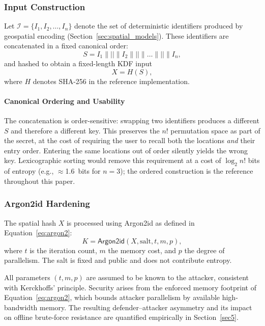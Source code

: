 \documentclass[mathematics,article,accept,pdftex,moreauthors]{Definitions/mdpi}
\begin{document}
\subsubsection{Input Construction}

Let $\mathcal{I} = \{I_1, I_2, \dots, I_n\}$ denote the set of deterministic identifiers produced by geospatial encoding (Section~\ref{sec:spatial_models}). These identifiers are concatenated in a fixed canonical order:
\begin{equation}
S = I_1 \parallel \texttt{||} \parallel I_2 \parallel \texttt{||} \parallel \dots \parallel \texttt{||} \parallel I_n ,
\label{eq:spatial_concat}
\end{equation}
and hashed to obtain a fixed-length KDF input
\begin{equation}
X = H(S),
\label{eq:spatial_hash}
\end{equation}
where $H$ denotes SHA-256 in the reference implementation.

\paragraph*{Canonical Ordering and Usability} 

{The concatenation is order-sensitive: swapping two identifiers produces a different $S$ and therefore a different key. This preserves the $n!$ permutation space as part of the secret, at the cost of requiring the user to recall both the locations \emph{and} their entry order. Entering the same locations out of order silently yields the wrong key. Lexicographic sorting would remove this requirement at a cost of $\log_2 n!$ bits of entropy (e.g., $\approx$1.6~bits for $n=3$); the ordered construction is the reference throughout this paper.}

\subsubsection{Argon2id Hardening}

The spatial hash $X$ is processed using Argon2id as defined in Equation~\eqref{eq:argon2}:
\begin{equation}
K = \mathsf{Argon2id}(X, \text{salt}, t, m, p),
\label{eq:argon2}
\end{equation}
where $t$ is the iteration count, $m$ the memory cost, and $p$ the degree of parallelism. The salt is fixed and public and does not contribute entropy.

All parameters $(t,m,p)$ are assumed to be known to the attacker, consistent with Kerckhoffs’ principle. Security arises from the enforced memory footprint of Equation~\eqref{eq:argon2}, which bounds attacker parallelism by available high-bandwidth memory. The resulting defender--attacker asymmetry and its impact on offline brute-force resistance are quantified empirically in Section~\ref{sec5}.
\end{document}
